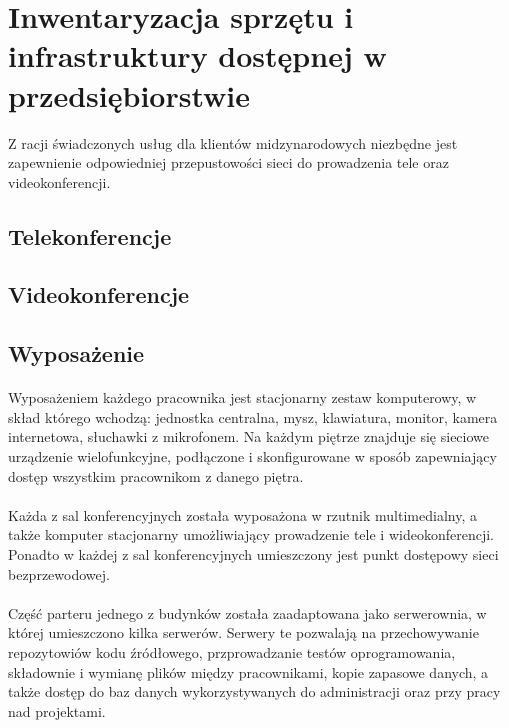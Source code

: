 \section{Inwentaryzacja sprzętu i infrastruktury dostępnej w przedsiębiorstwie}

Z racji świadczonych usług dla klientów midzynarodowych niezbędne jest zapewnienie odpowiedniej przepustowości sieci do prowadzenia tele oraz videokonferencji.


\subsection{Telekonferencje}


\subsection{Videokonferencje}


\subsection{Wyposażenie}
\paragraph{}
Wyposażeniem każdego pracownika jest stacjonarny zestaw komputerowy, w skład którego wchodzą: jednostka centralna, mysz, klawiatura, monitor, kamera internetowa, słuchawki z mikrofonem.
Na każdym piętrze znajduje się sieciowe urządzenie wielofunkcyjne, podłączone i skonfigurowane w sposób zapewniający dostęp wszystkim pracownikom z danego piętra.

\paragraph{}
Każda z sal konferencyjnych została wyposażona w rzutnik multimedialny, a także komputer stacjonarny umożliwiający prowadzenie tele i wideokonferencji.
Ponadto w każdej z sal konferencyjnych umieszczony jest punkt dostępowy sieci bezprzewodowej.

\paragraph{}
Część parteru jednego z budynków została zaadaptowana jako serwerownia, w której umieszczono kilka serwerów. Serwery te pozwalają na przechowywanie repozytowiów kodu źródłowego, przprowadzanie testów oprogramowania, składownie i wymianę plików między pracownikami, kopie zapasowe danych, a także dostęp do baz danych wykorzystywanych do administracji oraz przy pracy nad projektami.

